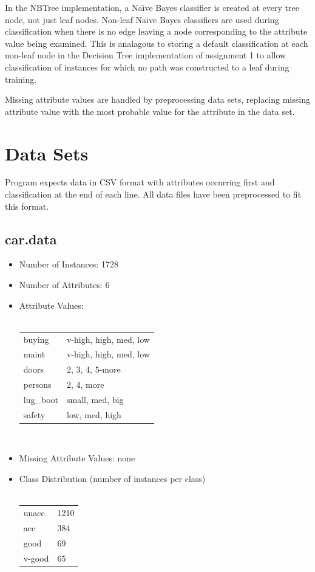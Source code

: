 \documentclass[10pt]{report}
\begin{document}
In the NBTree implementation, a Na\"{\i}ve Bayes classifier is created
at every tree node, not just leaf nodes. Non-leaf Na\"{\i}ve Bayes
classifiers are used during classification when there is no edge
leaving a node corresponding to the attribute value being
examined. This is analagous to storing a default classification at
each non-leaf node in the Decision Tree implementation of assignment 1
to allow classification of instances for which no path was constructed
to a leaf during training.

Missing attribute values are handled by preprocessing data sets,
replacing missing attribute value with the most probable value for the
attribute in the data set.


\section{Data Sets}
Program expects data in CSV format with attributes occurring first and
classification at the end of each line. All data files have been
preprocessed to fit this format.


\subsection*{car.data}
\begin{itemize}
\item Number of Instances: 1728
\item Number of Attributes: 6
\item Attribute Values:
  \\\\
  \begin{left}
    \begin{tabular}{ l l }
      buying     & v-high, high, med, low \\
      maint      & v-high, high, med, low \\
      doors      & 2, 3, 4, 5-more \\
      persons    & 2, 4, more \\
      lug\_boot  & small, med, big \\
      safety     & low, med, high \\
    \end{tabular}
  \end{left}
  \\
\item Missing Attribute Values: none
\item Class Distribution (number of instances per class)
  \\\\
  \begin{left}
    \begin{tabular}{ l l }
      unacc   &  1210 \\
      acc     &   384 \\   
      good    &    69 \\     
      v-good  &    65 \\
    \end{tabular}
  \end{left}
\end{itemize}
\end{document}
